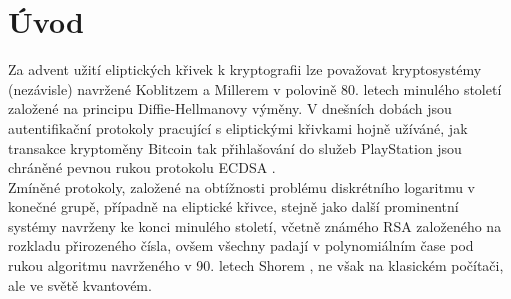 \documentclass [12pt]{report}
\begin{document}
{
\hypersetup{linkcolor=black}
\tableofcontents
}
\thispagestyle{empty}

\chapter*{Úvod}

Za advent užití eliptických křivek k kryptografii lze považovat kryptosystémy (nezávisle) navržené Koblitzem \cite{Koblitz} a Millerem \cite{Miller} v polovině 80. letech minulého století založené na principu Diffie-Hellmanovy \cite{Diffie} výměny. V dnešních dobách jsou autentifikační protokoly pracující s eliptickými křivkami hojně užíváné, jak transakce kryptoměny Bitcoin tak přihlašování do služeb PlayStation jsou chráněné pevnou rukou protokolu ECDSA \cite{ECDSA}.\\

Zmíněné protokoly, založené na obtížnosti problému diskrétního logaritmu v konečné grupě, případně na eliptické křivce, stejně jako další prominentní systémy navrženy ke konci minulého století, včetně  známého RSA \cite{RSA} založeného na rozkladu přirozeného čísla, ovšem všechny padají v polynomiálním čase pod rukou algoritmu navrženého v 90. letech Shorem \cite{Shor}, ne však na klasickém počítači, ale ve světě kvantovém.  
\end{document}
